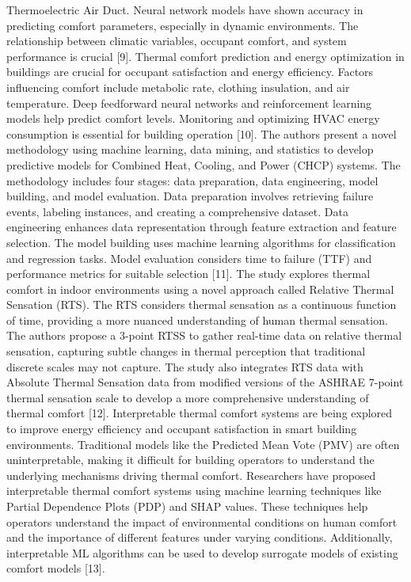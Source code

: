 Thermoelectric Air Duct. Neural network models have shown accuracy in
predicting comfort parameters, especially in dynamic environments. The
relationship between climatic variables, occupant comfort, and system
performance is crucial {[}9{]}. Thermal comfort prediction and energy
optimization in buildings are crucial for occupant satisfaction and
energy efficiency. Factors influencing comfort include metabolic rate,
clothing insulation, and air temperature. Deep feedforward neural
networks and reinforcement learning models help predict comfort levels.
Monitoring and optimizing HVAC energy consumption is essential for
building operation {[}10{]}. The authors present a novel methodology
using machine learning, data mining, and statistics to develop
predictive models for Combined Heat, Cooling, and Power (CHCP) systems.
The methodology includes four stages: data preparation, data
engineering, model building, and model evaluation. Data preparation
involves retrieving failure events, labeling instances, and creating a
comprehensive dataset. Data engineering enhances data representation
through feature extraction and feature selection. The model building
uses machine learning algorithms for classification and regression
tasks. Model evaluation considers time to failure (TTF) and performance
metrics for suitable selection {[}11{]}. The study explores thermal
comfort in indoor environments using a novel approach called Relative
Thermal Sensation (RTS). The RTS considers thermal sensation as a
continuous function of time, providing a more nuanced understanding of
human thermal sensation. The authors propose a 3-point RTSS to gather
real-time data on relative thermal sensation, capturing subtle changes
in thermal perception that traditional discrete scales may not capture.
The study also integrates RTS data with Absolute Thermal Sensation data
from modified versions of the ASHRAE 7-point thermal sensation scale to
develop a more comprehensive understanding of thermal comfort {[}12{]}.
Interpretable thermal comfort systems are being explored to improve
energy efficiency and occupant satisfaction in smart building
environments. Traditional models like the Predicted Mean Vote (PMV) are
often uninterpretable, making it difficult for building operators to
understand the underlying mechanisms driving thermal comfort.
Researchers have proposed interpretable thermal comfort systems using
machine learning techniques like Partial Dependence Plots (PDP) and SHAP
values. These techniques help operators understand the impact of
environmental conditions on human comfort and the importance of
different features under varying conditions. Additionally, interpretable
ML algorithms can be used to develop surrogate models of existing
comfort models {[}13{]}.

